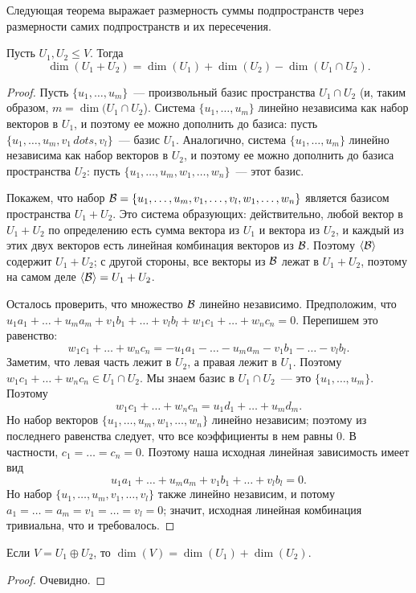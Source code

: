 Следующая теорема выражает размерность суммы подпространств
через размерности самих подпространств и их пересечения.
\begin{theorem}[Грассмана]
Пусть $U_1,U_2\leq V$. Тогда
$$
\dim(U_1+U_2) = \dim(U_1) + \dim(U_2) - \dim(U_1\cap U_2).
$$
\end{theorem}
\begin{proof}
Пусть $\{u_1,\dots,u_m\}$~--- произвольный базис пространства
$U_1\cap U_2$ (и, таким образом, $m = \dim(U_1\cap U_2$).
Система $\{u_1,\dots,u_m\}$ линейно независима как набор
векторов в $U_1$, и поэтому ее можно дополнить до базиса:
пусть $\{u_1,\dots,u_m,v_1\,dots,v_l\}$~--- базис $U_1$.
Аналогично, система $\{u_1,\dots,u_m\}$ линейно независима
как набор векторов в $U_2$, и поэтому ее можно дополнить
до базиса пространства $U_2$: пусть
$\{u_1,\dots,u_m,w_1,\dots,w_n\}$~--- этот базис.

Покажем, что
набор $\mathcal B = \{u_1,\dots,u_m,v_1,\dots,v_l,w_1,\dots,w_n\}$
является базисом пространства $U_1+U_2$.
Это система образующих: действительно, любой вектор в $U_1+U_2$
по определению есть сумма вектора из $U_1$ и вектора из $U_2$,
и каждый из этих двух векторов есть линейная комбинация
векторов из $\mathcal B$. Поэтому $\langle\mathcal B\rangle$ содержит $U_1+U_2$;
с другой стороны, все векторы из $\mathcal B$ лежат в $U_1+U_2$,
поэтому на самом деле $\langle\mathcal B\rangle = U_1 + U_2$.

Осталось проверить, что множество $\mathcal B$ линейно независимо.
Предположим, что $u_1a_1+\dots+u_ma_m + v_1b_1+\dots+v_lb_l +
w_1c_1+\dots +w_nc_n = 0$. Перепишем это равенство:
$$
w_1c_1+\dots+w_nc_n = -u_1a_1-\dots-u_ma_m - v_1b_1-\dots-v_lb_l.
$$
Заметим, что левая часть лежит в $U_2$, а правая лежит в $U_1$.
Поэтому $w_1c_1+\dots+w_nc_n\in U_1\cap U_2$. Мы знаем базис
в $U_1\cap U_2$~--- это $\{u_1,\dots,u_m\}$. Поэтому
$$
w_1c_1 + \dots + w_nc_n = u_1d_1+\dots+u_md_m.
$$
Но набор векторов $\{u_1,\dots,u_m,w_1,\dots,w_n\}$
линейно независим; поэтому из последнего равенства следует,
что все коэффициенты в нем равны 0.
В частности, $c_1=\dots=c_n=0$.
Поэтому наша исходная линейная зависимость имеет вид
$$
u_1a_1+\dots+u_ma_m + v_1b_1+\dots+v_lb_l = 0.
$$
Но набор $\{u_1,\dots,u_m,v_1,\dots,v_l\}$ также линейно
независим, и потому $a_1 = \dots = a_m = v_1 = \dots = v_l = 0$;
значит, исходная линейная комбинация тривиальна,
что и требовалось.
\end{proof}

\begin{corollary}\label{cor:direct-sum-dimension}
Если $V = U_1\oplus U_2$, то $\dim(V) = \dim(U_1)+\dim(U_2)$.
\end{corollary}
\begin{proof}
Очевидно.
\end{proof}

